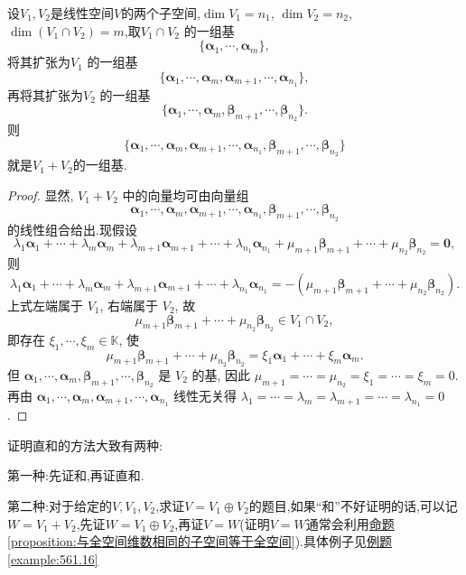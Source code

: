 \documentclass[../../main.tex]{subfiles}%
\begin{document}
\begin{corollary}\label{corollary:空间分解关于基的结论}
设\(V_1,V_2\)是线性空间\(V\)的两个子空间,$\dim V_1 = n_1$, $\dim V_2 = n_2$, $\dim(V_1 \cap V_2) = m$,取$V_1 \cap V_2$ 的一组基$$\{\boldsymbol{\alpha}_1, \cdots, \boldsymbol{\alpha}_m\},$$将其扩张为$V_1$ 的一组基$$\{\boldsymbol{\alpha}_1, \cdots, \boldsymbol{\alpha}_m, \boldsymbol{\alpha}_{m + 1}, \cdots, \boldsymbol{\alpha}_{n_1}\},$$
再将其扩张为$V_2$ 的一组基$$\{\boldsymbol{\alpha}_1, \cdots, \boldsymbol{\alpha}_m, \boldsymbol{\beta}_{m + 1}, \cdots, \boldsymbol{\beta}_{n_2}\}.$$
则
$$
\{\boldsymbol{\alpha}_1, \cdots, \boldsymbol{\alpha}_m, \boldsymbol{\alpha}_{m + 1}, \cdots, \boldsymbol{\alpha}_{n_1}, \boldsymbol{\beta}_{m + 1}, \cdots, \boldsymbol{\beta}_{n_2}\}
$$
就是$V_1+V_2$的一组基.
\end{corollary}
\begin{proof}
显然, $V_1 + V_2$ 中的向量均可由向量组
$$
\boldsymbol{\alpha}_1, \cdots, \boldsymbol{\alpha}_m, \boldsymbol{\alpha}_{m + 1}, \cdots, \boldsymbol{\alpha}_{n_1}, \boldsymbol{\beta}_{m + 1}, \cdots, \boldsymbol{\beta}_{n_2}
$$
的线性组合给出.现假设
$$
\lambda_1\boldsymbol{\alpha}_1 + \cdots + \lambda_m\boldsymbol{\alpha}_m + \lambda_{m + 1}\boldsymbol{\alpha}_{m + 1} + \cdots + \lambda_{n_1}\boldsymbol{\alpha}_{n_1} + \mu_{m + 1}\boldsymbol{\beta}_{m + 1} + \cdots + \mu_{n_2}\boldsymbol{\beta}_{n_2} = \boldsymbol{0},
$$
则
$$
\lambda_1\boldsymbol{\alpha}_1 + \cdots + \lambda_m\boldsymbol{\alpha}_m + \lambda_{m + 1}\boldsymbol{\alpha}_{m + 1} + \cdots + \lambda_{n_1}\boldsymbol{\alpha}_{n_1} = -(\mu_{m + 1}\boldsymbol{\beta}_{m + 1} + \cdots + \mu_{n_2}\boldsymbol{\beta}_{n_2}).
$$
上式左端属于 $V_1$, 右端属于 $V_2$, 故
$$
\mu_{m + 1}\boldsymbol{\beta}_{m + 1} + \cdots + \mu_{n_2}\boldsymbol{\beta}_{n_2} \in V_1 \cap V_2,
$$
即存在 $\xi_1, \cdots, \xi_m \in \mathbb{K}$, 使
$$
\mu_{m + 1}\boldsymbol{\beta}_{m + 1} + \cdots + \mu_{n_2}\boldsymbol{\beta}_{n_2} = \xi_1\boldsymbol{\alpha}_1 + \cdots + \xi_m\boldsymbol{\alpha}_m.
$$
但 $\boldsymbol{\alpha}_1, \cdots, \boldsymbol{\alpha}_m, \boldsymbol{\beta}_{m + 1}, \cdots, \boldsymbol{\beta}_{n_2}$ 是 $V_2$ 的基, 因此 $\mu_{m + 1} = \cdots = \mu_{n_2} = \xi_1 = \cdots = \xi_m = 0$. 再由 $\boldsymbol{\alpha}_1, \cdots, \boldsymbol{\alpha}_m, \boldsymbol{\alpha}_{m + 1}, \cdots, \boldsymbol{\alpha}_{n_1}$ 线性无关得 $\lambda_1 = \cdots = \lambda_m = \lambda_{m + 1} = \cdots = \lambda_{n_1} = 0$. 
\end{proof}


\begin{conclusion}
证明直和的方法大致有两种:

第一种:先证和,再证直和. 

第二种:对于给定的\(V,V_1,V_2\),求证\(V = V_1\oplus V_2\)的题目,如果“和”不好证明的话,可以记\(W = V_1 + V_2\),先证\(W = V_1\oplus V_2\),再证\(V = W\)(证明\(V = W\)通常会利用\hyperref[proposition:与全空间维数相同的子空间等于全空间]{命题\ref{proposition:与全空间维数相同的子空间等于全空间}}).具体例子见\hyperref[example:561.16]{例题\ref{example:561.16}}
\end{conclusion}
\end{document}

